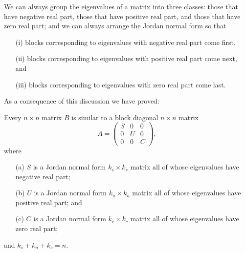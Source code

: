 We can always group the eigenvalues of a matrix into three classes: those 
that have negative real part, 
those that have positive real part, 
and those that have zero real part; and 
we can always arrange the Jordan normal form so 
that 
\begin{itemize}
\item[(i)] blocks corresponding to eigenvalues with negative real part come first,
\item[(ii)] blocks corresponding to eigenvalues with positive real part come 
next, and
\item[(iii)] blocks corresponding to eigenvalues with zero real part come last.
\end{itemize}
As a consequence of this discussion we have proved:
\begin{prop}  \label{P:SUC}
Every $n\times n$ matrix $B$ is similar to a 
block diagonal $n\times n$ matrix
\begin{equation} \label{e:SUC}
A = \left(\begin{array}{ccc} S & 0 & 0 \\ 0 & U & 0\\ 0 & 0 & C \end{array}
\right),
\end{equation}
where
\begin{itemize}
\item[(a)]	$S$ is a Jordan normal form
$k_s\times k_s$ matrix all of whose eigenvalues have negative real part;
\item[(b)]	$U$ is a Jordan normal form $k_u\times k_u$ matrix all
of whose eigenvalues have positive real part; and
\item[(c)]	$C$ is a Jordan normal form $k_c\times k_c$ matrix all
of whose eigenvalues have zero real part;
\end{itemize}
and $k_s+k_u+k_c=n$.
\end{prop}

